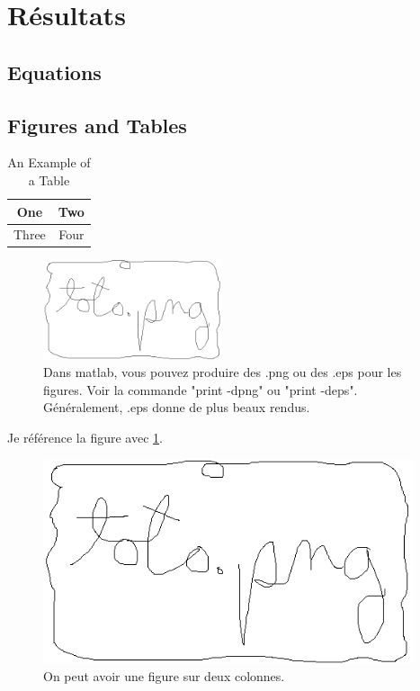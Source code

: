 \documentclass[letterpaper, 10 pt, conference]{ieeeconf}  %
\begin{document}
\section{Résultats}

\subsection{Equations}

\subsection{Figures and Tables}


\begin{table}[h]
\caption{An Example of a Table}
\label{table_example}
\begin{center}
\begin{tabular}{|c||c|}
\hline
One & Two\\
\hline
Three & Four\\
\hline
\end{tabular}
\end{center}
\end{table}

\begin{figure}[thpb]
      \centering
      \includegraphics[width=0.47\textwidth]{toto.png}
      \caption{Dans matlab, vous pouvez produire des .png ou des .eps pour les figures. Voir la commande "print -dpng" ou "print -deps". Généralement, .eps donne de plus beaux rendus.}
      \label{MaFigure}
\end{figure}
   

Je référence la figure avec \ref{MaFigure}.

\begin{figure}[thpb]
      \centering
      \includegraphics[width=0.97\textwidth]{toto.png}
      \caption{On peut avoir une figure sur deux colonnes.}
      \label{MaFigureDouble}
\end{figure}
\end{document}
